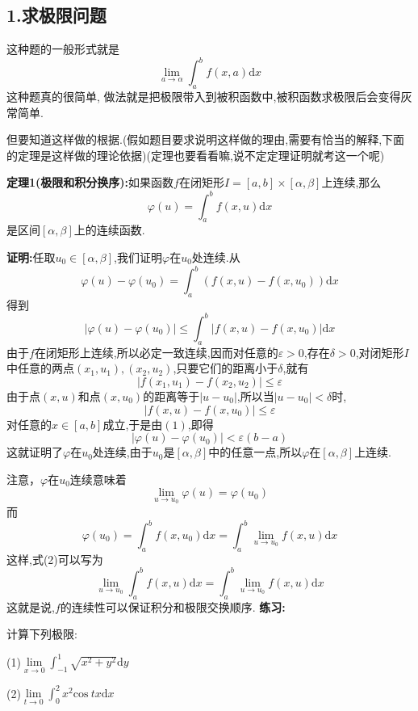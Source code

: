 \documentclass{ctexart}
\begin{document}
\subsection*{1.求极限问题}
这种题的一般形式就是$$\lim_{a \rightarrow \alpha}\int_{a}^{b}f(x,a)\mathrm{d}x$$
这种题真的很简单,
做法就是把极限带入到被积函数中,被积函数求极限后会变得灰常简单.

但要知道这样做的根据.(假如题目要求说明这样做的理由,需要有恰当的解释,下面的定理是这样做的理论依据)(定理也要看看嘛,说不定定理证明就考这一个呢)

\textbf{定理1(极限和积分换序):}如果函数$f$在闭矩形$I=[a,b]\times[\alpha,\beta]$上连续,那么$$\varphi(u)=\int_{a}^{b}f(x,u)\mathrm{d}x$$是区间$[\alpha,\beta]$上的连续函数.

\textbf{证明:}任取$u_{0}\in[\alpha,\beta]$,我们证明$\varphi$在$u_{0}$处连续.从
\begin{equation}
\varphi(u)-\varphi(u_{0})=\int_{a}^{b}(f(x,u)-f(x,u_{0}))\mathrm{d}x
\end{equation}
得到
$$|\varphi(u)-\varphi(u_{0})|\leq \int_{a}^{b}|f(x,u)-f(x,u_{0})|\mathrm{d}x$$
由于$f$在闭矩形上连续,所以必定一致连续,因而对任意的$\varepsilon>0$,存在$\delta>0$,对闭矩形$I$中任意的两点$(x_{1},u_{1}),(x_{2},u_{2})$,只要它们的距离小于$\delta$,就有$$|f(x_{1},u_{1})-f(x_{2},u_{2})|\leq \varepsilon$$
由于点$(x,u)$和点$(x,u_{0})$的距离等于$|u-u_{0}|$,所以当$|u-u_{0}|<\delta$时,$$|f(x,u)-f(x,u_{0})|\leq \varepsilon$$对任意的$x\in[a,b]$成立,于是由$(1)$,即得
$$|\varphi(u)-\varphi(u_{0})|<\varepsilon(b-a)$$
这就证明了$\varphi$在$u_{0}$处连续,由于$u_{0}$是$[\alpha,\beta]$中的任意一点,所以$\varphi$在$[\alpha,\beta]$上连续.

注意，$\varphi$在$u_{0}$连续意味着\begin{equation}\lim_{u\rightarrow u_{0}}\varphi(u)=\varphi(u_{0})\end{equation}
而$$\varphi(u_{0})=\int_{a}^{b}f(x,u_{0})\mathrm{d}x=\int_{a}^{b}\lim_{u\rightarrow u_{0}}f(x,u)\mathrm{d}x$$
这样,式(2)可以写为$$\lim_{u\rightarrow u_{0}}\int_{a}^{b}f(x,u)\mathrm{d}x=\int_{a}^{b}\lim_{u\rightarrow u_{0}}f(x,u)\mathrm{d}x$$
这就是说,$f$的连续性可以保证积分和极限交换顺序.
\newline
\newline
\indent\textbf{练习:}

计算下列极限:

(1)$\lim\limits_{x\rightarrow 0}\int_{-1}^{1}\sqrt{x^{2}+y^{2}}\mathrm{d}y$

(2)$\lim\limits_{t\rightarrow 0}\int_{0}^{2}x^{2}\mathrm{cos}\ tx\mathrm{d}x$
\end{document}
